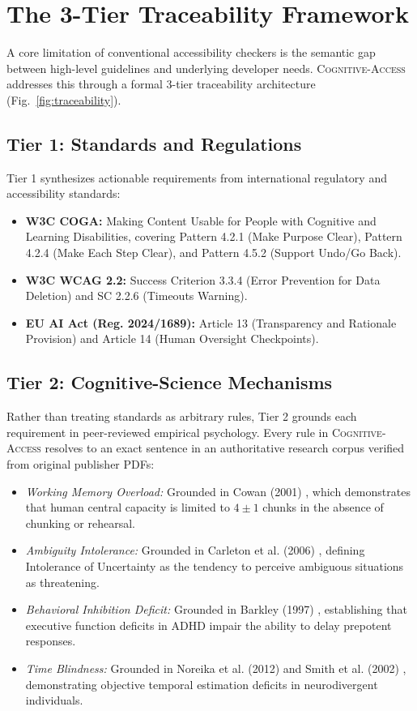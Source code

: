 \documentclass[conference]{IEEEtran}
\begin{document}
\section{The 3-Tier Traceability Framework}
A core limitation of conventional accessibility checkers is the semantic gap between high-level guidelines and underlying developer needs. \textsc{Cognitive-Access} addresses this through a formal 3-tier traceability architecture (Fig.~\ref{fig:traceability}).

\subsection{Tier 1: Standards and Regulations}
Tier 1 synthesizes actionable requirements from international regulatory and accessibility standards:
\begin{itemize}
    \item \textbf{W3C COGA:} Making Content Usable for People with Cognitive and Learning Disabilities, covering Pattern 4.2.1 (Make Purpose Clear), Pattern 4.2.4 (Make Each Step Clear), and Pattern 4.5.2 (Support Undo/Go Back).
    \item \textbf{W3C WCAG 2.2:} Success Criterion 3.3.4 (Error Prevention for Data Deletion) and SC 2.2.6 (Timeouts Warning).
    \item \textbf{EU AI Act (Reg. 2024/1689):} Article 13 (Transparency and Rationale Provision) and Article 14 (Human Oversight Checkpoints).
\end{itemize}

\subsection{Tier 2: Cognitive-Science Mechanisms}
Rather than treating standards as arbitrary rules, Tier 2 grounds each requirement in peer-reviewed empirical psychology. Every rule in \textsc{Cognitive-Access} resolves to an exact sentence in an authoritative research corpus verified from original publisher PDFs:
\begin{itemize}
    \item \textit{Working Memory Overload:} Grounded in Cowan (2001) \cite{cowan2001}, which demonstrates that human central capacity is limited to $4 \pm 1$ chunks in the absence of chunking or rehearsal.
    \item \textit{Ambiguity Intolerance:} Grounded in Carleton et al. (2006) \cite{carleton2006}, defining Intolerance of Uncertainty as the tendency to perceive ambiguous situations as threatening.
    \item \textit{Behavioral Inhibition Deficit:} Grounded in Barkley (1997) \cite{barkley1997}, establishing that executive function deficits in ADHD impair the ability to delay prepotent responses.
    \item \textit{Time Blindness:} Grounded in Noreika et al. (2012) \cite{noreika2012} and Smith et al. (2002) \cite{smith2002}, demonstrating objective temporal estimation deficits in neurodivergent individuals.
\end{itemize}
\end{document}
